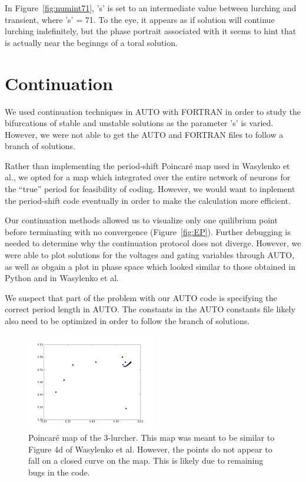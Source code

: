\documentclass[12pt,letterpaper,oneside,openany]{article}
\begin{document}
In Figure~\ref{fig:numint71}, 's' is set to an intermediate value between lurching and transient, where 's' = 71. To the eye, it appears as if solution will continue lurching indefinitely, but the phase portrait associated with it seems to hint that is actually near the beginngs of a toral solution.

\section{Continuation}

We used continuation techniques in AUTO with FORTRAN in order to study the bifurcations of stable and unstable solutions as the parameter 's' is varied. However, we were not able to get the AUTO and FORTRAN files to follow a branch of solutions.

Rather than implementing the period-shift Poincar\'{e} map used in Wasylenko et al.\cite{Wasylenko2010}, we opted for a map which integrated over the entire network of neurons for the ``true'' period for feasibility of coding. However, we would want to inplement the period-shift code eventually in order to make the calculation more efficient.

Our continuation methods allowed us to visualize only one quilibrium point before terminating with no convergence (Figure~\ref{fig:EP}). Further debugging is needed to determine why the continuation protocol does not diverge. However, we were able to plot solutions for the voltages and gating variables through AUTO, as well as obgain a plot in phase space which looked similar to those obtained in Python and in Wasylenko et al.\cite{Wasylenko2010}

We suspect that part of the problem with our AUTO code is specifying the correct period length in AUTO. The constants in the AUTO constants file likely also need to be optimized in order to follow the branch of solutions.

\begin{figure}[t]
  \centering
  \includegraphics[width=0.5\textwidth]{4dNOPE.png}
  \caption{Poincar\'{e} map of the 3-lurcher. This map was meant to be similar to Figure 4d of Wasylenko et al. However, the points do not appear to fall on a closed curve on the map. This is likely due to remaining bugs in the code.}
  \label{fig:4dNOPE}
\end{figure}
\end{document}

